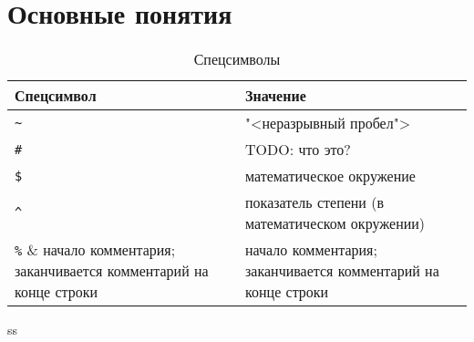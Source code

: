 \section{Основные понятия}

\begin{table}[h]
    \caption{Спецсимволы}
    \label{specsymbols}
    \begin{tabular}{|l|p{}|}
        \hline
        Спецсимвол & Значение \\ \hline
        \verb|~| & "<неразрывный пробел"> \\ \hline
        \verb|#| & TODO: что это? \\ \hline
        \verb|$| & математическое окружение \\ \hline
        \verb|^| & показатель степени (в математическом окружении) \\ \hline
        \verb|%| & начало комментария; заканчивается комментарий на конце строки \\ \hline
    \end{tabular}
\end{table}

ss

\clearpage